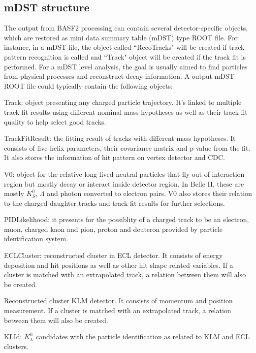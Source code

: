 \subsection{mDST structure}

The output from BASF2 processing can contain several detector-specific objects, which are restored as mini data summary table (mDST) type ROOT file. For instance, in a mDST file, the object called ``RecoTracks" will be created if track pattern recognition is called and ``Track" object will be created if the track fit is performed. For a mDST level analysis, the goal is usually aimed to find particles from physical processes and reconstruct decay information. A output mDST ROOT file could typically contain the following objects:

\textbullet \space Track: object presenting any charged particle trajectory. It's linked to multiple track fit results using different nominal mass hypotheses as well as their track fit quality to help select good tracks.  

\textbullet \space TrackFitResult: the fitting result of tracks with different mass hypotheses. It consists of five helix parameters, their covariance matrix and p-value from the fit. It also stores the information of hit pattern on vertex detector and CDC. 

\textbullet \space V0: object for the relative long-lived neutral particles that fly out of interaction region but mostly decay or interact inside detector region. In Belle II, these are mostly $K_S^0$, $\Lambda$ and photon converted to electron pairs. V0 also stores their relation to the charged daughter tracks and track fit results for further selections.


\textbullet \space PIDLikelihood: it presents for the possiblity of a charged track to be an electron, muon, charged kaon and pion, proton and deuteron provided by particle identification system. 

\textbullet \space ECLCluster: reconstructed cluster in ECL detector. It consists of energy deposition and hit positions as well as other hit shape related variables. If a cluster is matched with an extrapolated track, a relation between them will also be created. 

\textbullet \space Reconstructed cluster KLM detector. It consists of momentum and position measurement. If a cluster is matched with an extrapolated track, a relation between them will also be created. 

\textbullet \space KLId: $K_L^0$ candidates with the particle identification as related to KLM and ECL clusters. 

